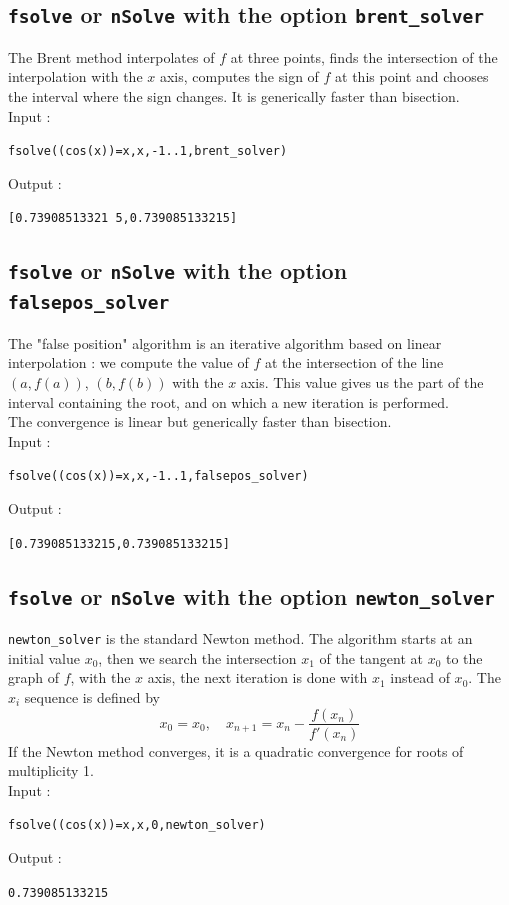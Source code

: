\documentclass[a4paper,11pt]{book}
\begin{document}
\subsection{{\tt fsolve} or {\tt nSolve} with the option {\tt brent\_solver}}
The Brent method interpolates of $f$ at three points, finds
the intersection of the interpolation with the $x$ axis, computes
the sign of $f$ at this point and chooses the interval where the sign changes.
It is generically faster than bisection.\\
Input :
\begin{center}{\tt fsolve((cos(x))=x,x,-1..1,brent\_solver)}\end{center}
Output :
\begin{center}{\tt [0.73908513321 5,0.739085133215]}\end{center}

\subsection{{\tt fsolve} or {\tt nSolve} with the option {\tt falsepos\_solver}}
The "false position" algorithm is an iterative algorithm based on linear 
interpolation : we compute the value of $f$ at the intersection of the line  
$(a,f(a))$, $(b,f(b))$ with the $x$ axis. This value gives us the part of the 
interval containing the root, and on which a new iteration is performed.\\
The convergence is linear but generically faster than bisection.\\
Input :
\begin{center}{\tt fsolve((cos(x))=x,x,-1..1,falsepos\_solver)}\end{center}
Output :
\begin{center}{\tt [0.739085133215,0.739085133215]}\end{center}

\subsection{{\tt fsolve} or {\tt nSolve} with the option {\tt newton\_solver}}
{\tt newton\_solver} is the standard Newton method.
The algorithm starts at an initial value  $x_0$, then we search the 
intersection $x_1$ of the tangent at $x_0$ to the graph of $f$, with the $x$ 
axis, the next iteration is done with $x_1$ instead of $x_0$.
The  $x_i$ sequence is defined by
\[ x_0=x_0, \quad x_{n+1}=x_n-\frac{f(x_n)}{f'(x_n)} \]
If the Newton method converges, it is a quadratic convergence for 
roots of multiplicity 1.\\
Input :
\begin{center}{\tt fsolve((cos(x))=x,x,0,newton\_solver)}\end{center}
Output :
\begin{center}{\tt 0.739085133215}\end{center}
\end{document}
